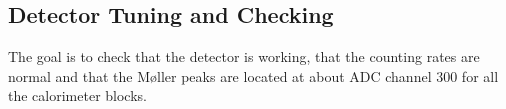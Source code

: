 {%


\subsection{Detector Tuning and Checking }
\label{sec:dettune}

The goal is to check that the detector is working, that the counting rates
are normal and that the M{\o}ller peaks are located at about ADC channel 300
for all the calorimeter blocks.

}

